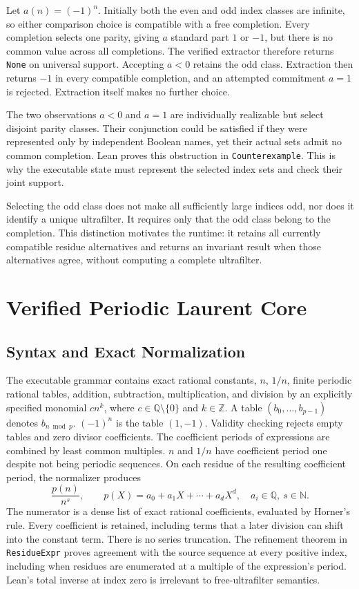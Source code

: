 \documentclass[11pt,a4paper]{article}
\theoremstyle{result}
\theoremstyle{definition}
\newcommand{\N}{\mathbb{N}}
\newcommand{\Q}{\mathbb{Q}}
\newcommand{\code}[1]{\texttt{#1}}
\begin{document}
Let $a(n)=(-1)^n$. Initially both the even and odd index classes are infinite, so either comparison choice is compatible with a free completion. Every completion selects one parity, giving $a$ standard part $1$ or $-1$, but there is no common value across all completions. The verified extractor therefore returns \code{None} on universal support. Accepting $a<0$ retains the odd class. Extraction then returns $-1$ in every compatible completion, and an attempted commitment $a=1$ is rejected. Extraction itself makes no further choice.

The two observations $a<0$ and $a=1$ are individually realizable but select disjoint parity classes. Their conjunction could be satisfied if they were represented only by independent Boolean names, yet their actual sets admit no common completion. Lean proves this obstruction in \code{Counterexample}. This is why the executable state must represent the selected index sets and check their joint support.

Selecting the odd class does not make all sufficiently large indices odd, nor does it identify a unique ultrafilter. It requires only that the odd class belong to the completion. This distinction motivates the runtime: it retains all currently compatible residue alternatives and returns an invariant result when those alternatives agree, without computing a complete ultrafilter.

\section{Verified Periodic Laurent Core}\label{sec:verified-laurent}

\subsection{Syntax and Exact Normalization}

The executable grammar contains exact rational constants, $n$, $1/n$, finite periodic rational tables, addition, subtraction, multiplication, and division by an explicitly specified monomial $c n^k$, where $c\in\Q\setminus\{0\}$ and $k\in\mathbb Z$. A table $(b_0,\ldots,b_{p-1})$ denotes $b_{n\bmod p}$. $(-1)^n$ is the table $(1,-1)$. Validity checking rejects empty tables and zero divisor coefficients. The coefficient periods of expressions are combined by least common multiples. $n$ and $1/n$ have coefficient period one despite not being periodic sequences. On each residue of the resulting coefficient period, the normalizer produces
\[
  \frac{p(n)}{n^s},\qquad
  p(X)=a_0+a_1X+\cdots+a_dX^d,\quad a_i\in\Q,\ s\in\N.
\]
The numerator is a dense list of exact rational coefficients, evaluated by Horner's rule. Every coefficient is retained, including terms that a later division can shift into the constant term. There is no series truncation. The refinement theorem in \code{ResidueExpr} proves agreement with the source sequence at every positive index, including when residues are enumerated at a multiple of the expression's period. Lean's total inverse at index zero is irrelevant to free-ultrafilter semantics.
\end{document}
